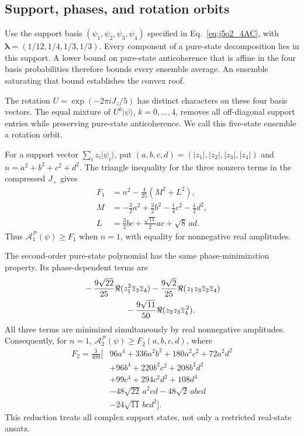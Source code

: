 \documentclass[11pt]{article}
\newcommand{\A}{\mathcal A}
\begin{document}
\subsection{Support, phases, and rotation orbits}
Use the support basis $(\psi_1,\psi_2,\psi_3,\psi_4)$ specified in Eq.~\eqref{eq:j5o2_4AC}, with
$\boldsymbol\lambda=(1/12,1/4,1/3,1/3)$. Every component of a pure-state decomposition lies in this support. A lower bound on pure-state anticoherence that is affine in the four basis probabilities therefore bounds every ensemble average. An ensemble saturating that bound establishes the convex roof.

The rotation $U=\exp(-2\pi iJ_z/5)$ has distinct characters on these four basis vectors. The equal mixture of $U^k|\psi\rangle$, $k=0,\ldots,4$, removes all off-diagonal support entries while preserving pure-state anticoherence. We call this five-state ensemble a rotation orbit.

For a support vector $\sum_i z_i|\psi_i\rangle$, put $(a,b,c,d)=(|z_1|,|z_2|,|z_3|,|z_4|)$ and $n=a^2+b^2+c^2+d^2$. The triangle inequality for the three nonzero terms in the compressed $J_+$ gives
\begin{align}\label{eq:roof_F1}
 F_1&=n^2-\tfrac4{25}(M^2+L^2),\\
 M&=-\tfrac32a^2+\tfrac32b^2-\tfrac14c^2-\tfrac12d^2,\nonumber\\
 L&=\tfrac32bc+\tfrac{\sqrt{11}}2ac+\sqrt8\,ad.\nonumber
\end{align}
Thus $\A_1^{\mathcal P}(\psi)\ge F_1$ when $n=1$, with equality for nonnegative real amplitudes.

The second-order pure-state polynomial has the same phase-minimization property. Its phase-dependent terms are
\begin{align}
 &-\frac{9\sqrt{22}}{25}\Re(z_1^2\overline z_3\overline z_4)
 -\frac{9\sqrt2}{25}\Re(z_1z_3\overline z_2\overline z_4)\nonumber\\
 &\hspace{18mm}-\frac{9\sqrt{11}}{50}\Re(z_2z_3\overline z_4^{\,2}).
\end{align}
All three terms are minimized simultaneously by real nonnegative amplitudes. Consequently, for $n=1$,
$\A_2^{\mathcal P}(\psi)\ge F_2(a,b,c,d)$, where
\begin{align}\label{eq:roof_F2_real}
 F_2=\frac3{400}\bigl[&96a^4+336a^2b^2+180a^2c^2
 +72a^2d^2\nonumber\\
 &+96b^4+220b^2c^2+208b^2d^2\nonumber\\
 &+99c^4+294c^2d^2+108d^4\nonumber\\
 &-48\sqrt{22}\,a^2cd-48\sqrt2\,abcd\nonumber\\
 &-24\sqrt{11}\,bcd^2\bigr].
\end{align}
This reduction treats all complex support states, not only a restricted real-state ansatz.
\end{document}
